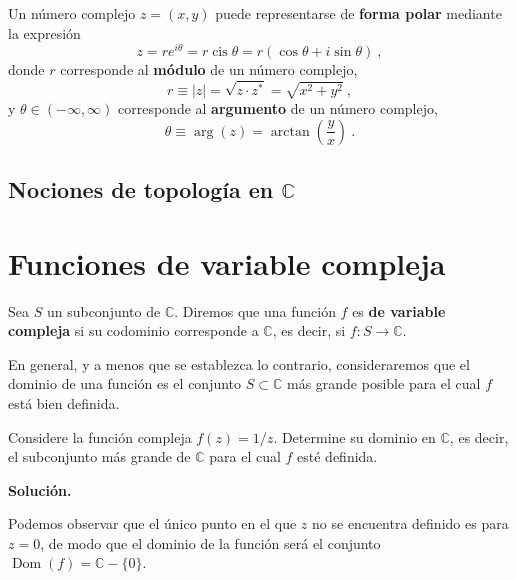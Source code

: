 \begin{defi}
    Un número complejo $z = (x,y)$ puede representarse de \textbf{forma polar} mediante la expresión
    \begin{equation}
        z = r e^{i\theta} = r \operatorname{cis}{\theta} = r(\cos \theta + i \sin \theta) \ ,
    \end{equation}
    donde $r$ corresponde al \textbf{módulo} de un número complejo, 
    \begin{equation}
        r \equiv |z| = \sqrt{z \cdot z^\ast} = \sqrt{x^2 + y^2} \ ,
    \end{equation}
    y $\theta \in (-\infty, \infty)$ corresponde al \textbf{argumento} de un número complejo,
    \begin{equation}
        \theta \equiv \arg{(z)} = \arctan\left( \frac{y}{x} \right) \ . 
    \end{equation}
\end{defi}

\subsection{Nociones de topología en $\mathbb{C}$}


\section{Funciones de variable compleja}

\begin{defi}
    Sea $S$ un subconjunto de $\mathbb{C}$. Diremos que una función $f$ es \textbf{de variable compleja} si su codominio corresponde a $\mathbb{C}$, es decir, si $f: S \to \mathbb{C}$.
\end{defi}

En general, y a menos que se establezca lo contrario, consideraremos que el dominio de una función es el conjunto $S \subset \mathbb{C}$ más grande posible para el cual $f$ está bien definida. 

\begin{ejemplo}
    Considere la función compleja $f(z) = 1/z$. Determine su dominio en $\mathbb{C}$, es decir, el subconjunto más grande de $\mathbb{C}$ para el cual $f$ esté definida.

    \noindent \textbf{Solución.}

    \noindent Podemos observar que el único punto en el que $z$ no se encuentra definido es para $z = 0$, de modo que el dominio de la función será el conjunto $\operatorname{Dom}(f) = \mathbb{C} - \{ 0 \} $.
\end{ejemplo}

